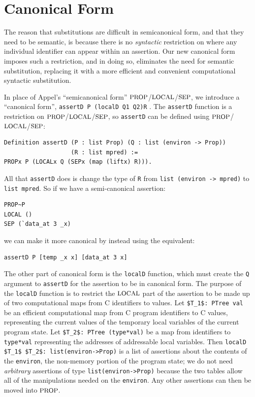\documentclass{puthesis}
\begin{document}
\section{Canonical Form}
\label{sec:cform}
The reason that substitutions are difficult in semicanonical form, and
that they need to be semantic, is because there is no \emph{syntactic}
restriction on where any individual identifier can appear within an
assertion. Our new canonical form imposes such a restriction, and in doing
so, eliminates the need for semantic substitution, replacing it with a
more efficient and convenient computational syntactic substitution.

In place of Appel's ``semicanonical form'' $\mbox{\small PROP}$/$\mbox{\small LOCAL}$/$\mbox{\small SEP}$, we
introduce a ``canonical form'', \lstinline|assertD P (localD Q1 Q2)R|
.
The \lstinline|assertD| function is a restriction on
$\mbox{\small PROP}$/$\mbox{\small LOCAL}$/$\mbox{\small SEP}$, so \lstinline|assertD| can be defined using
$\mbox{\small PROP}$/$\mbox{\small LOCAL}$/$\mbox{\small SEP}$:

\begin{lstlisting}
Definition assertD (P : list Prop) (Q : list (environ -> Prop)) 
                   (R : list mpred) := 
PROPx P (LOCALx Q (SEPx (map (liftx) R))).
\end{lstlisting}

All that \lstinline|assertD| does is change the type of \lstinline|R| from 
\lstinline|list (environ -> mpred)| to \lstinline|list mpred|.
So if we have a semi-canonical assertion:

\begin{lstlisting}
PROP~P
LOCAL ()
SEP (`data_at 3 _x)
\end{lstlisting}

we can make it more canonical by instead using the equivalent:

\begin{lstlisting}
assertD P [temp _x x] [data_at 3 x]
\end{lstlisting}

The other part of canonical form is the \lstinline|localD| function,
which must create the \lstinline|Q| argument to \lstinline|assertD|
for the assertion to be in canonical form. The purpose of the
\lstinline|localD| function is to restrict the $\mbox{\small LOCAL}$ part of the
assertion to be made up of two computational maps from C identifiers
to values. Let \lstinline{$T_1$: PTree val} be an efficient
computational map from C program identifiers to C values, representing
the current values of the temporary local variables of the current
program state. Let \lstinline{$T_2$: PTree (type*val)} be a map from
identifiers to \lstinline{type*val} representing the addresses of
addressable local variables.  
Then \lstinline{localD $T_1$ $T_2$: list(environ->Prop)} is a list of
assertions about the contents of the \lstinline{environ}, the
non-memory portion of the program state;
we do not need \emph{arbitrary} assertions of type
\lstinline{list(environ->Prop)} because the two tables allow all of
the manipulations needed on the \lstinline|environ|. Any other
assertions can then be moved into $\mbox{\small PROP}$.
\end{document}
